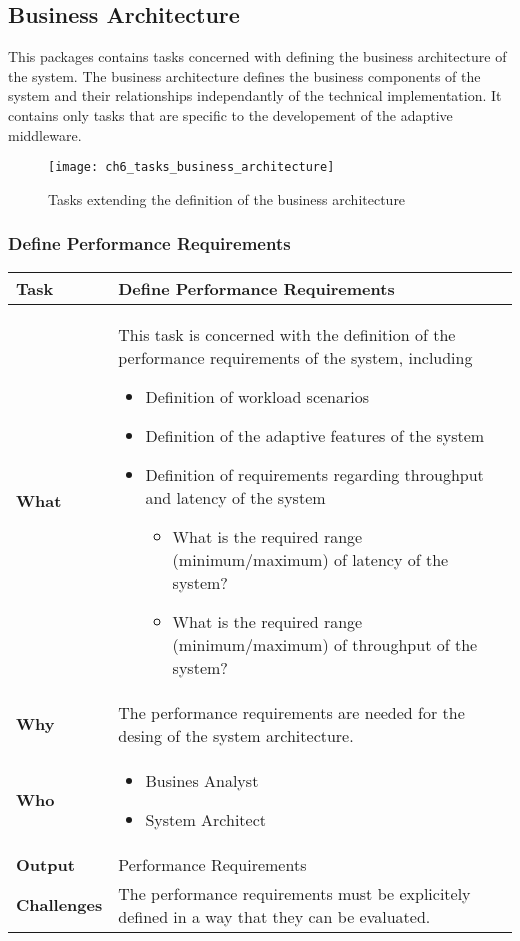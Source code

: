 \subsection{Business Architecture}
This packages contains tasks concerned with defining the business architecture of the system. The business architecture defines the business components of the system and their relationships independantly of the technical implementation. It contains only tasks that are specific to the developement of the adaptive middleware.

\begin{figure}[htpb] \centering 
	\texttt{[image: ch6\_tasks\_business\_architecture]} 
	\caption{Tasks extending the definition of the business architecture} 
	\label{fig:ch6_tasks_business_architecture} 
\end{figure}

\subsubsection{Define Performance Requirements}
\begin{tabularx}{\textwidth}{@{} l X @{}}
	\caption{Define Performance Requirements} \label{table:ch6_Task_Define_Performance Requirements}\\
	\toprule
	\bfseries Task & Define Performance Requirements\\
	\midrule\bfseries What & 
	This task is concerned with the definition of the performance requirements of the system, including
	\begin{itemize}
		\item Definition of workload scenarios
		\item Definition of the adaptive features of the system
		\item Definition of requirements regarding throughput and latency of the system
		\begin{itemize}
			\item What is the required range (minimum/maximum) of latency of the system?
			\item What is the required range (minimum/maximum) of throughput of the system?
		\end{itemize}
	\end{itemize}
	\\
	\midrule
	\bfseries Why & The performance requirements are needed for the desing of the system architecture.\\
	\midrule
	\bfseries Who & 
	\begin{itemize}
		\item Busines Analyst
		\item System Architect
	\end{itemize}\\
	\midrule
	\bfseries Output & Performance Requirements\\
	\midrule
	\bfseries Challenges & The performance requirements must be explicitely defined in a way that they can be evaluated.\\
	\bottomrule
\end{tabularx}

